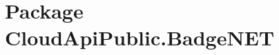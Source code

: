 \hypertarget{namespace_cloud_api_public_1_1_badge_n_e_t}{\section{Package Cloud\-Api\-Public.\-Badge\-N\-E\-T}
\label{namespace_cloud_api_public_1_1_badge_n_e_t}
}
